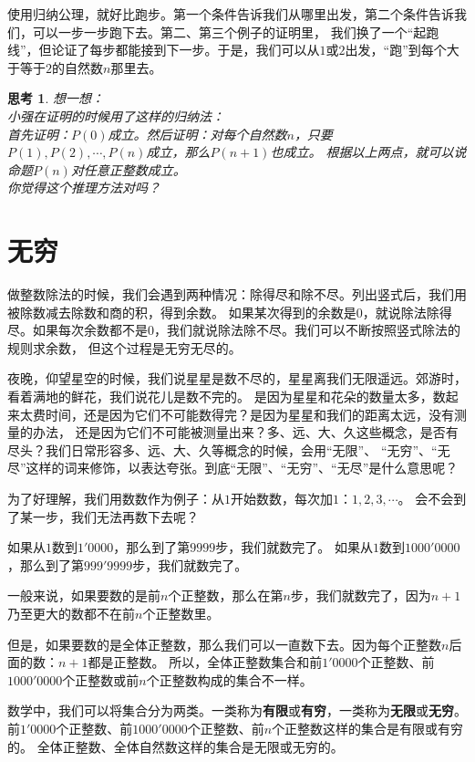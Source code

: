 \documentclass[12pt,UTF8]{ctexbook}
\newtheorem{sk}{思考}[section]
\begin{document}
使用归纳公理，就好比跑步。第一个条件告诉我们从哪里出发，第二个条件告诉我们，可以一步一步跑下去。第二、第三个例子的证明里，
我们换了一个“起跑线”，但论证了每步都能接到下一步。于是，我们可以从$1$或$2$出发，“跑”到每个大于等于$2$的自然数$n$那里去。

\begin{sk}\label{sk:2-2-1}
    想一想：\\
    小强在证明的时候用了这样的归纳法：\\
    首先证明：$P(0)$成立。然后证明：对每个自然数$n$，只要$P(1), P(2), \cdots , P(n)$成立，那么$P(n+1)$也成立。
    根据以上两点，就可以说命题$P(n)$对任意正整数成立。\\
    你觉得这个推理方法对吗？
\end{sk}

\section{无穷}
做整数除法的时候，我们会遇到两种情况：除得尽和除不尽。列出竖式后，我们用被除数减去除数和商的积，得到余数。
如果某次得到的余数是$0$，就说除法除得尽。如果每次余数都不是$0$，我们就说除法除不尽。我们可以不断按照竖式除法的规则求余数，
但这个过程是无穷无尽的。

夜晚，仰望星空的时候，我们说星星是数不尽的，星星离我们无限遥远。郊游时，看着满地的鲜花，我们说花儿是数不完的。
是因为星星和花朵的数量太多，数起来太费时间，还是因为它们不可能数得完？是因为星星和我们的距离太远，没有测量的办法，
还是因为它们不可能被测量出来？多、远、大、久这些概念，是否有尽头？我们日常形容多、远、大、久等概念的时候，会用“无限”、
“无穷”、“无尽”这样的词来修饰，以表达夸张。到底“无限”、“无穷”、“无尽”是什么意思呢？

为了好理解，我们用数数作为例子：从$1$开始数数，每次加$1$：$1,2,3,\cdots$。
会不会到了某一步，我们无法再数下去呢？

如果从$1$数到$1'0000$，那么到了第$9999$步，我们就数完了。
如果从$1$数到$1000'0000$，那么到了第$999'9999$步，我们就数完了。

一般来说，如果要数的是前$n$个正整数，那么在第$n$步，我们就数完了，因为$n+1$乃至更大的数都不在前$n$个正整数里。

但是，如果要数的是全体正整数，那么我们可以一直数下去。因为每个正整数$n$后面的数：$n+1$都是正整数。
所以，全体正整数集合和前$1'0000$个正整数、前$1000'0000$个正整数或前$n$个正整数构成的集合不一样。

数学中，我们可以将集合分为两类。一类称为\textbf{有限}或\textbf{有穷}，一类称为\textbf{无限}或\textbf{无穷}。
前$1'0000$个正整数、前$1000'0000$个正整数、前$n$个正整数这样的集合是有限或有穷的。
全体正整数、全体自然数这样的集合是无限或无穷的。
\end{document}
